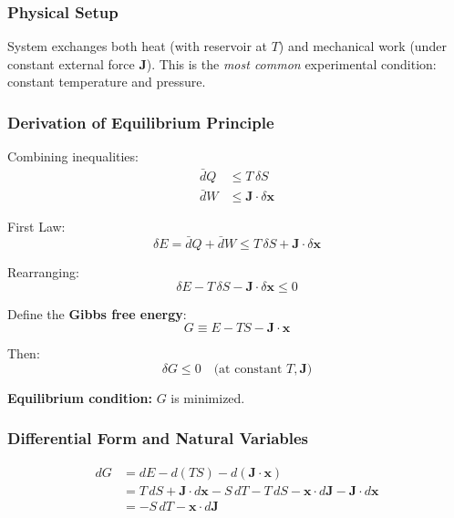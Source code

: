\documentclass[9pt,twocoloumn]{article}
\begin{document}
\subsubsection{Physical Setup}
System exchanges both heat (with reservoir at $T$) and mechanical work (under constant external force $\mathbf{J}$). This is the \emph{most common} experimental condition: constant temperature and pressure.

\subsubsection{Derivation of Equilibrium Principle}

Combining inequalities:
\begin{align}
\bar{d}Q &\leq T \, \delta S \\
\bar{d}W &\leq \mathbf{J} \cdot \delta \mathbf{x}
\end{align}

First Law:
\begin{equation}
\delta E = \bar{d}Q + \bar{d}W \leq T \, \delta S + \mathbf{J} \cdot \delta \mathbf{x}
\end{equation}

Rearranging:
\begin{equation}
\delta E - T \, \delta S - \mathbf{J} \cdot \delta \mathbf{x} \leq 0
\end{equation}

Define the \textbf{Gibbs free energy}:
\begin{equation}
\boxed{G \equiv E - TS - \mathbf{J} \cdot \mathbf{x}}
\end{equation}

Then:
\begin{equation}
\boxed{\delta G \leq 0 \quad \text{(at constant } T, \mathbf{J} \text{)}}
\end{equation}

\textbf{Equilibrium condition:} $G$ is minimized.

\subsubsection{Differential Form and Natural Variables}

\begin{align}
dG &= dE - d(TS) - d(\mathbf{J} \cdot \mathbf{x}) \\
&= T \, dS + \mathbf{J} \cdot d\mathbf{x} - S \, dT - T \, dS - \mathbf{x} \cdot d\mathbf{J} - \mathbf{J} \cdot d\mathbf{x} \\
&= -S \, dT - \mathbf{x} \cdot d\mathbf{J}
\end{align}
\end{document}
